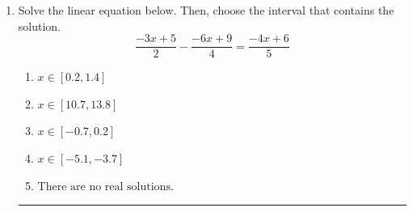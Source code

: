 \documentclass[14pt]{extbook}
\newcommand{\litem}[1]{\item#1\hspace*{-1cm}\rule{\textwidth}{0.4pt}}
\begin{document}
\begin{enumerate}
{\begin{enumerate}[label=\Alph*.]
\end{enumerate} }
\litem{
Solve the linear equation below. Then, choose the interval that contains the solution.\[ \frac{-3x + 5}{2} - \frac{-6x + 9}{4} = \frac{-4x + 6}{5} \]\begin{enumerate}[label=\Alph*.]
\item \( x \in [0.2, 1.4] \)
\item \( x \in [10.7, 13.8] \)
\item \( x \in [-0.7, 0.2] \)
\item \( x \in [-5.1, -3.7] \)
\item \( \text{There are no real solutions.} \)

\end{enumerate} }
\end{enumerate}
\end{document}
